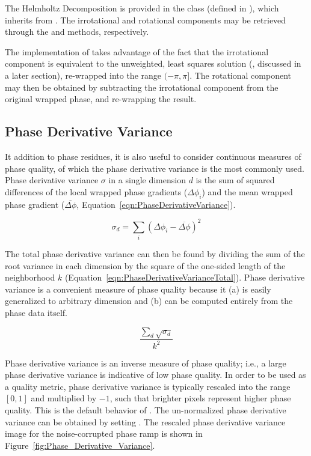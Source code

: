 The Helmholtz Decomposition is provided in the  class (defined in ), which inherits from .  The irrotational and rotational components may be retrieved through the  and  methods, respectively.

The implementation of  takes advantage of the fact that the irrotational component is equivalent to the unweighted, least squares solution (, discussed in a later section), re-wrapped into the range $(-\pi, \pi]$.  The rotational component may then be obtained by subtracting the irrotational component from the original wrapped phase, and re-wrapping the result.

\subsection{Phase Derivative Variance}

It addition to phase residues, it is also useful to consider continuous measures of phase quality, of which the phase derivative variance is the most commonly used.  Phase derivative variance $\sigma$ in a single dimension $d$ is the sum of squared differences of the local wrapped phase gradients ($\Delta \phi_{i}$) and the mean wrapped phase gradient ($\overline{ \Delta \phi }$, Equation~\ref{eqn:PhaseDerivativeVariance}). 

\begin{equation}
\label{eqn:PhaseDerivativeVariance}
\sigma_d = \sum_i{  \left( \Delta \phi_{i} - \overline{ \Delta \phi }     \right)^2  }
\end{equation}

The total phase derivative variance can then be found by dividing the sum of the root variance in each dimension by the square of the one-sided length of the neighborhood $k$ (Equation~\ref{eqn:PhaseDerivativeVarianceTotal}).  Phase derivative variance is a convenient measure of phase quality because it (a) is easily generalized to arbitrary dimension and (b) can be computed entirely from the phase data itself.

\begin{equation}
\label{eqn:PhaseDerivativeVarianceTotal}
\frac{ \sum_d { \sqrt{ \sigma_d } }  }{ k^2 }
\end{equation}

Phase derivative variance is an inverse measure of phase quality; i.e., a large phase derivative variance is indicative of low phase quality.  In order to be used as a quality metric, phase derivative variance is typically rescaled into the range $[0,1]$ and multiplied by $-1$, such that brighter pixels represent higher phase quality.  This is the default behavior of .  The un-normalized phase derivative variance can be obtained by setting .  The rescaled phase derivative variance image for the noise-corrupted phase ramp is shown in Figure~\ref{fig:Phase_Derivative_Variance}.

